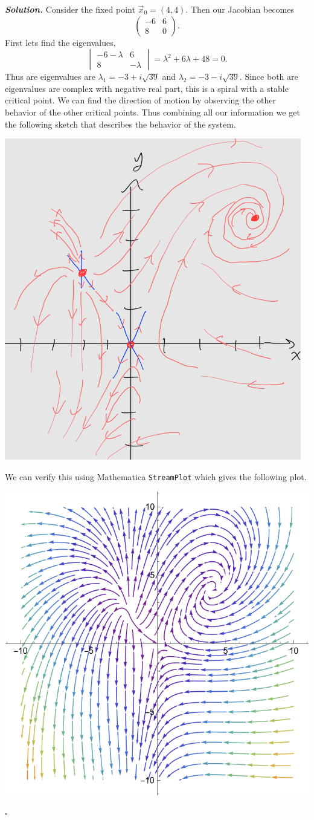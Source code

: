 \documentclass[12pt]{report}
\newenvironment{solution}[1][\it{Solution}]{\textbf{#1. } }{$\square$}
\begin{document}
\begin{solution}
    \noindent
    Consider the fixed point $\vec{x}_0 = (4,4)$. Then our Jacobian becomes
    \[ 
        \begin{pmatrix}
            -6 & 6 \\
            8 & 0  
        \end{pmatrix}.
    \]
    First lets find the eigenvalues,
    \[ 
        \begin{vmatrix}
            -6 - \lambda & 6 \\
            8 & - \lambda 
        \end{vmatrix} = \lambda^2 + 6\lambda + 48 = 0.
    \]
    Thus are eigenvalues are $\lambda_1 = -3 + i\sqrt{39}$ and $\lambda_2 = -3 - i\sqrt{39}$. Since both are eigenvalues are complex with negative real part, this is a spiral with a stable critical point. We can find the direction of motion by observing the other behavior of the other critical points. Thus combining all our information we get the following sketch that describes the behavior of the system. 
    \begin{center}
        \includegraphics[width=.6\linewidth]{images/10hand.PNG}
    \end{center}


    \noindent
    We can verify this using Mathematica \verb+StreamPlot+ which gives the following plot.
    \begin{center}
       \includegraphics[width=.6\linewidth]{images/10.png}
    \end{center}

\end{solution}
\end{document}
